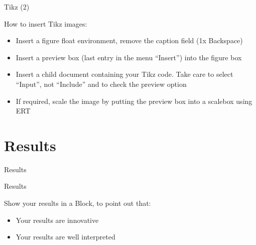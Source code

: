 \documentclass[english,american,german,aspectratio=169]{beamer}
\begin{document}
\begin{frame}{Tikz (2)}

  \begin{block}{How to insert Tikz images:}

    \begin{itemize}
      \item Insert a figure float environment, remove the caption
        field (1x Backspace)
      \item Insert a preview box (last entry in the menu ``Insert'') into the
        figure box
      \item Insert a child document containing your Tikz code. Take
        care to select
        ``Input'', not ``Include'' and to check the preview option
      \item If required, scale the image by putting the preview box
        into a scalebox
        using ERT
    \end{itemize}
  \end{block}
\end{frame}

\section{Results}
\begin{frame}{Results}

  \begin{center}
    \begin{figure}
      \scalebox{0.75}{}
    \end{figure}
    \par
  \end{center}
  \begin{alertblock}{Results}

    Show your results in a Block, to point out that:
    \begin{itemize}
      \item Your results are innovative
      \item Your results are well interpreted
    \end{itemize}
  \end{alertblock}
\end{frame}
\end{document}
